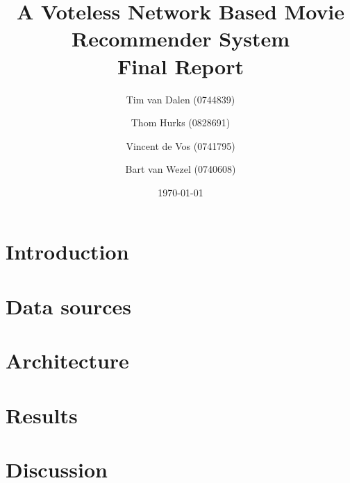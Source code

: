 \documentclass[a4paper,11pt,twocolumn]{article}
\title{
	A Voteless Network Based Movie Recommender System\\
	\vspace{2 mm}
	\Large{Final Report}
}
\author{
	Tim van Dalen (0744839)
	\and
	Thom Hurks (0828691)
	\and
	Vincent de Vos (0741795)
	\and
	Bart van Wezel (0740608)
}
\date{\today}
\begin{document}
	\maketitle
	
	
	
	\section{Introduction}
	\label{sec:intro}
	
	
	\section{Data sources}
	\label{sec:data}
	
	
	\section{Architecture}
	\label{sec:arch}
	
	
	\section{Results}
	\label{sec:results}
	
	
	\section{Discussion}
	\label{sec:discussion}
	
	
	
\end{document}
